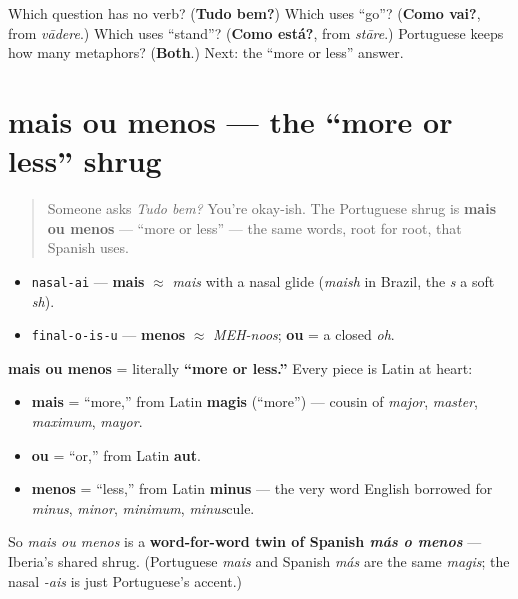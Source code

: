 \begin{tcolorbox}[breakable,colback=teal!4,colframe=teal!35!black,title={Before you move on}]
Which question has no verb? (\textbf{Tudo bem?}) Which uses “go”? (\textbf{Como vai?}, from \emph{vādere}.) Which uses “stand”? (\textbf{Como está?}, from \emph{stāre}.) Portuguese keeps how many metaphors? (\textbf{Both}.) Next: the “more or less” answer.
\end{tcolorbox}
\section[mais ou menos]{mais ou menos — the \textquotedblleft{}more or less\textquotedblright{} shrug}

\label{lesson:PT-C02-mais-ou-menos}



\begin{quote}
Someone asks \emph{Tudo bem?} You're okay-ish. The Portuguese shrug is \textbf{mais ou menos} — \textquotedblleft{}more or less\textquotedblright{} — the same words, root for root, that Spanish uses.
\end{quote}

\begin{sounds}
\begin{itemize}
\raggedright
  \item \texttt{nasal-ai} — \textbf{mais} $\approx$ \emph{mais} with a nasal glide (\emph{maish} in Brazil, the \emph{s} a soft \emph{sh}).
  \item \texttt{final-o-is-u} — \textbf{menos} $\approx$ \emph{MEH-noos}; \textbf{ou} = a closed \emph{oh}.
\end{itemize}
\end{sounds}

\begin{cousinweb}
\textbf{mais ou menos} = literally \textbf{\textquotedblleft{}more or less.\textquotedblright{}} Every piece is Latin at heart:

\begin{itemize}
\raggedright
  \item \textbf{mais} = \textquotedblleft{}more,\textquotedblright{} from Latin \textbf{magis} (\textquotedblleft{}more\textquotedblright{}) — cousin of \emph{major}, \emph{master}, \emph{maximum}, \emph{mayor}.
  \item \textbf{ou} = \textquotedblleft{}or,\textquotedblright{} from Latin \textbf{aut}.
  \item \textbf{menos} = \textquotedblleft{}less,\textquotedblright{} from Latin \textbf{minus} — the very word English borrowed for \emph{minus}, \emph{minor}, \emph{minimum}, \emph{minus}cule.
\end{itemize}

So \emph{mais ou menos} is a \textbf{word-for-word twin of Spanish \emph{más o menos}} — Iberia's shared shrug. (Portuguese \emph{mais} and Spanish \emph{más} are the same \emph{magis}; the nasal \emph{-ais} is just Portuguese's accent.)
\end{cousinweb}

